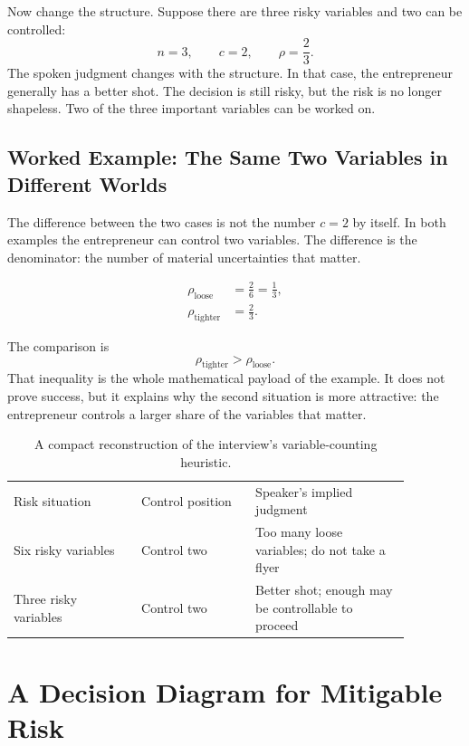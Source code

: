 Now change the structure. Suppose there are three risky variables and two can be controlled:
\begin{equation}
n=3,\qquad c=2,\qquad \rho=\frac{2}{3}.
\end{equation}
The spoken judgment changes with the structure. In that case, the entrepreneur generally has a better shot. The decision is still risky, but the risk is no longer shapeless. Two of the three important variables can be worked on.

\subsection{Worked Example: The Same Two Variables in Different Worlds}

The difference between the two cases is not the number \(c=2\) by itself. In both examples the entrepreneur can control two variables. The difference is the denominator: the number of material uncertainties that matter.

\begin{align}
\rho_{\mathrm{loose}} &= \frac{2}{6}=\frac{1}{3},\\
\rho_{\mathrm{tighter}} &= \frac{2}{3}.
\end{align}

The comparison is
\begin{equation}
\rho_{\mathrm{tighter}} > \rho_{\mathrm{loose}}.
\end{equation}
That inequality is the whole mathematical payload of the example. It does not prove success, but it explains why the second situation is more attractive: the entrepreneur controls a larger share of the variables that matter.

\begin{table}
\centering
\begin{tabular}{p{0.28\linewidth} p{0.25\linewidth} p{0.34\linewidth}}
Risk situation & Control position & Speaker's implied judgment \\
Six risky variables & Control two & Too many loose variables; do not take a flyer \\
Three risky variables & Control two & Better shot; enough may be controllable to proceed \\
\end{tabular}
\caption{A compact reconstruction of the interview's variable-counting heuristic.}
\end{table}

\section{A Decision Diagram for Mitigable Risk}

